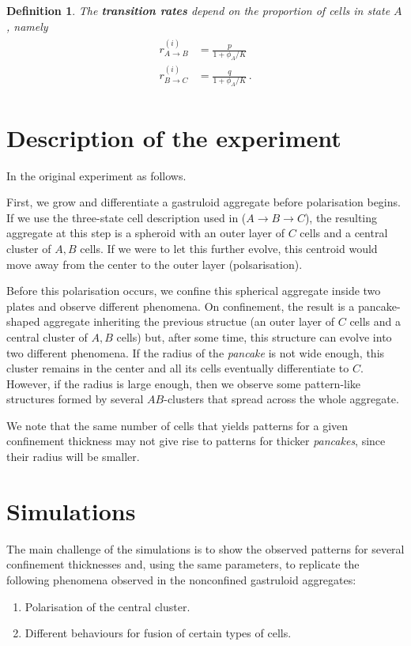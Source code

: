 \documentclass{article}
\newtheorem{definition}{Definition}
\begin{document}
\begin{definition}
    The \textbf{transition rates} depend on the proportion of cells in state $A$, namely
    \begin{align}
        \begin{aligned}
            r_{A\rightarrow B}^{(i)}&=\frac{p}{1+\phi_A/K}\\
            r_{B\rightarrow C}^{(i)}&=\frac{q}{1+\phi_A/K} \,.
        \end{aligned}
    \end{align}
\end{definition}


\section{Description of the experiment}

In the original experiment as follows.

First, we grow and differentiate a gastruloid aggregate before polarisation begins. If we use the three-state cell description used in \cite{oriola} ($A\to B\to C$), the resulting aggregate at this step is a spheroid with an outer layer of $C$ cells and a central cluster of $A,B$ cells. If we were to let this further evolve, this centroid would move away from the center to the outer layer (polsarisation).

Before this polarisation occurs, we confine this spherical aggregate inside two plates and observe different phenomena. On confinement, the result is a pancake-shaped aggregate inheriting the previous structue (an outer layer of $C$ cells and a central cluster of $A,B$ cells) but, after some time, this structure can evolve into two different phenomena. If the radius of the \textit{pancake} is not wide enough, this cluster remains in the center and all its cells eventually differentiate to $C$. However, if the radius is large enough, then we observe some pattern-like structures formed by several $AB$-clusters that spread across the whole aggregate.

We note that the same number of cells that yields patterns for a given confinement thickness may not give rise to patterns for thicker \textit{pancakes}, since their radius will be smaller.


\section{Simulations}

The main challenge of the simulations is to show the observed patterns for several confinement thicknesses and, using the same parameters, to replicate the following phenomena observed in the nonconfined gastruloid aggregates:
\begin{enumerate}
    \item Polarisation of the central cluster.
    \item Different behaviours for fusion of certain types of cells.
\end{enumerate}
\end{document}
